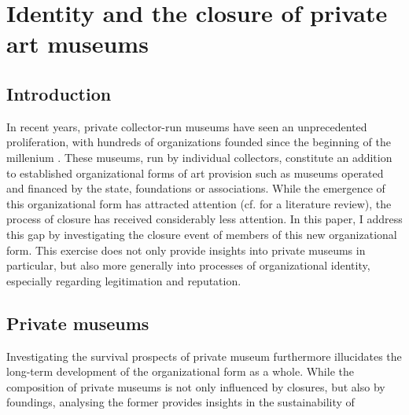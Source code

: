 \documentclass[12pt]{article}
\author{Johannes }
\date{\today}
\title{}
\begin{document}
\section*{Identity and the closure of private art museums}



\subsection*{Introduction}


In recent years, private collector-run museums have seen an unprecedented proliferation, with hundreds of organizations founded since the beginning of the millenium \parencite{Velthuis_etal_2023_boom,LarrysList_2015_report}.
These museums, run by individual collectors, constitute an addition to established organizational forms of art provision such as museums operated and financed by the state, foundations or associations.
While the emergence of this organizational form has attracted attention (cf. \cite{Kolbe_etal_2022_privatemuseum} for a literature review), the process of closure has received considerably less attention.
In this paper, I address this gap by investigating the closure event of members of this new organizational form.
This exercise does not only provide insights into private museums in particular, but also more generally into processes of organizational identity, especially regarding legitimation and reputation. 



\subsection*{Private museums}


Investigating the survival prospects of private museum furthermore illucidates the long-term development of the organizational form as a whole.
While the composition of private museums is not only influenced by closures, but also by foundings, analysing the former provides insights in the sustainability of
\end{document}

